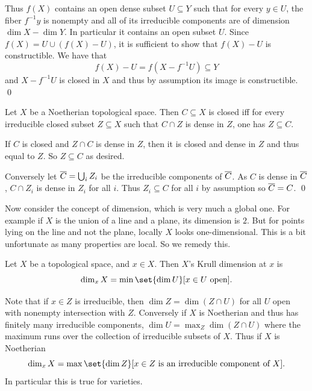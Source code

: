     Thus $f(X)$ contains an open dense subset $U\subseteq Y$ such that for every $y\in U$, the fiber $f^{-1}y$ is
    nonempty and all of its irreducible components are of dimension $\dim X-\dim Y$.
    In particular it contains an open subset $U$.
    Since $f(X)=U\cup(f(X)-U)$, it is sufficient to show that $f(X)-U$ is constructible.
    We have that
    $$ f(X) - U = f(X-f^{-1}U) \subseteq Y $$
    and $X-f^{-1}U$ is closed in $X$ and thus by assumption its image is constructible.
    \qed

\eproof

\blemm

    Let $X$ be a Noetherian topological space.
    Then $C\subseteq X$ is closed iff for every irreducible closed subset $Z\subseteq X$ such that $C\cap Z$ is dense in
    $Z$, one has $Z\subseteq C$.

\elemm

\bproof

    If $C$ is closed and $Z\cap C$ is dense in $Z$, then it is closed and dense in $Z$ and thus equal to $Z$.
    So $Z\subseteq C$ as desired.

    Conversely let ${\overline{C}}=\bigcup_iZ_i$ be the irreducible components of ${\overline{C}}$.
    As $C$ is dense in ${\overline{C}}$, $C\cap Z_i$ is dense in $Z_i$ for all $i$.
    Thus $Z_i\subseteq C$ for all $i$ by assumption so ${\overline{C}}=C$.
    \qed

\eproof

Now consider the concept of dimension, which is very much a global one.
For example if $X$ is the union of a line and a plane, its dimension is $2$.
But for points lying on the line and not the plane, locally $X$ looks one-dimensional.
This is a bit unfortunate as many properties are local.
So we remedy this.

\bdefn

    Let $X$ be a topological space, and $x\in X$.
    Then $X$'s {\emphcolor Krull dimension at $x$} is
    $$ \dim_xX = \min\set{\dim U}[x\in U\hbox{ open}] . $$

\edefn

Note that if $x\in Z$ is irreducible, then $\dim Z=\dim(Z\cap U)$ for all $U$ open with nonempty intersection with $Z$.
Conversely if $X$ is Noetherian and thus has finitely many irreducible components, $\dim U=\max_Z\dim(Z\cap U)$ where the
maximum runs over the collection of irreducible subsets of $X$.
Thus if $X$ is Noetherian
$$ \dim_xX = \max\set{\dim Z}[x\in Z\hbox{ is an irreducible component of $X$}] . $$
In particular this is true for varieties.


